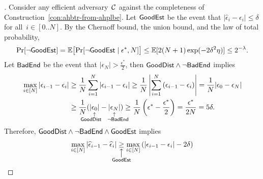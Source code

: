 \begin{proof}[]
Consider any efficient adversary~${\mathcal{C}}$ against the completeness of Construction~\ref{con:ahbtr-from-ahplbe}.
Let $\GoodEst$ be the event that ${|\widehat{\epsilon}_i-\epsilon_i|\leq\delta}$ for all~${i\in[0..N]}$.
By the Chernoff bound, the union bound, and the law of total probability,
\begin{align*}
\Pr[\neg\GoodEst]
=\E\bigl[\Pr[\neg\GoodEst\mid\epsilon^\ast,N]\bigr]
\leq\E[2({N+1})\exp({-2\delta^2\eta})]
\leq 2^{-\lambda}.
\end{align*}
Let $\BadEnd$ be the event that ${|\epsilon_N|>\frac{\epsilon^\ast}{2}}$,
then ${\GoodDist\wedge\neg\BadEnd}$ implies
\begin{align*}
\max_{i\in[N]}{|\epsilon_{i-1}-\epsilon_i|}
&{}\geq
\frac1N\sum_{i=1}^{N}{|\epsilon_{i-1}-\epsilon_i|}
\geq
\frac1N\left|\sum_{i=1}^{N}{(\epsilon_{i-1}-\epsilon_i)}\right|
=
\frac1N|\epsilon_0-\epsilon_N|
\\&{}\geq
\frac1N(
\underset{\mathclap{\substack{\uparrow\\{\GoodDist}\quad\vphantom{G}}}}{|\epsilon_0|}
-
\underset{\mathclap{\substack{\uparrow\\\quad{\neg\BadEnd}\vphantom{G}}}}{|\epsilon_N|}
)
\geq
\frac1N\left(
\epsilon^\ast
-\frac{\epsilon^\ast}{2}
\right)
=
\frac{\epsilon^\ast}{2N}
=
5\delta.
\end{align*}
Therefore, ${\GoodDist\wedge\neg\BadEnd\wedge\GoodEst}$ implies
\begin{align*}
\max_{i\in[N]}{|\widehat{\epsilon}_{i-1}-\widehat{\epsilon}_i|}
\underset{\mathclap{\substack{
\big\uparrow\\\GoodEst\vphantom{G}
}}}{\geq}
\max_{i\in[N]}{(|\epsilon_{i-1}-\epsilon_i|-2\delta)}

\end{align*}
\end{proof}
